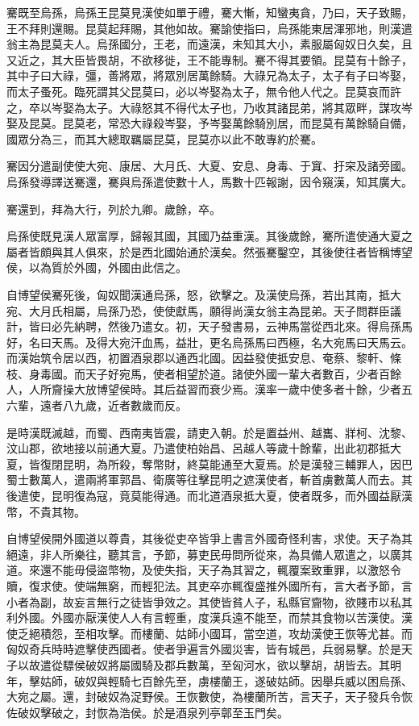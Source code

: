 騫既至烏孫，烏孫王昆莫見漢使如單于禮，騫大慚，知蠻夷貪，乃曰，天子致賜，王不拜則還賜。昆莫起拜賜，其他如故。騫諭使指曰，烏孫能東居渾邪地，則漢遣翁主為昆莫夫人。烏孫國分，王老，而遠漢，未知其大小，素服屬匈奴日久矣，且又近之，其大臣皆畏胡，不欲移徙，王不能專制。騫不得其要領。昆莫有十餘子，其中子曰大祿，彊，善將眾，將眾別居萬餘騎。大祿兄為太子，太子有子曰岑娶，而太子蚤死。臨死謂其父昆莫曰，必以岑娶為太子，無令他人代之。昆莫哀而許之，卒以岑娶為太子。大祿怒其不得代太子也，乃收其諸昆弟，將其眾畔，謀攻岑娶及昆莫。昆莫老，常恐大祿殺岑娶，予岑娶萬餘騎別居，而昆莫有萬餘騎自備，國眾分為三，而其大總取羈屬昆莫，昆莫亦以此不敢專約於騫。

騫因分遣副使使大宛、康居、大月氏、大夏、安息、身毒、于窴、扜穼及諸旁國。烏孫發導譯送騫還，騫與烏孫遣使數十人，馬數十匹報謝，因令窺漢，知其廣大。

騫還到，拜為大行，列於九卿。歲餘，卒。

烏孫使既見漢人眾富厚，歸報其國，其國乃益重漢。其後歲餘，騫所遣使通大夏之屬者皆頗與其人俱來，於是西北國始通於漢矣。然張騫鑿空，其後使往者皆稱博望侯，以為質於外國，外國由此信之。

自博望侯騫死後，匈奴聞漢通烏孫，怒，欲擊之。及漢使烏孫，若出其南，抵大宛、大月氏相屬，烏孫乃恐，使使獻馬，願得尚漢女翁主為昆弟。天子問群臣議計，皆曰必先納聘，然後乃遣女。初，天子發書易，云神馬當從西北來。得烏孫馬好，名曰天馬。及得大宛汗血馬，益壯，更名烏孫馬曰西極，名大宛馬曰天馬云。而漢始筑令居以西，初置酒泉郡以通西北國。因益發使抵安息、奄蔡、黎軒、條枝、身毒國。而天子好宛馬，使者相望於道。諸使外國一輩大者數百，少者百餘人，人所齎操大放博望侯時。其后益習而衰少焉。漢率一歲中使多者十餘，少者五六輩，遠者八九歲，近者數歲而反。

是時漢既滅越，而蜀、西南夷皆震，請吏入朝。於是置益州、越巂、牂柯、沈黎、汶山郡，欲地接以前通大夏。乃遣使柏始昌、呂越人等歲十餘輩，出此初郡抵大夏，皆復閉昆明，為所殺，奪幣財，終莫能通至大夏焉。於是漢發三輔罪人，因巴蜀士數萬人，遣兩將軍郭昌、衛廣等往擊昆明之遮漢使者，斬首虜數萬人而去。其後遣使，昆明復為寇，竟莫能得通。而北道酒泉抵大夏，使者既多，而外國益厭漢幣，不貴其物。

自博望侯開外國道以尊貴，其後從吏卒皆爭上書言外國奇怪利害，求使。天子為其絕遠，非人所樂往，聽其言，予節，募吏民毋問所從來，為具備人眾遣之，以廣其道。來還不能毋侵盜幣物，及使失指，天子為其習之，輒覆案致重罪，以激怒令贖，復求使。使端無窮，而輕犯法。其吏卒亦輒復盛推外國所有，言大者予節，言小者為副，故妄言無行之徒皆爭效之。其使皆貧人子，私縣官齎物，欲賤市以私其利外國。外國亦厭漢使人人有言輕重，度漢兵遠不能至，而禁其食物以苦漢使。漢使乏絕積怨，至相攻擊。而樓蘭、姑師小國耳，當空道，攻劫漢使王恢等尤甚。而匈奴奇兵時時遮擊使西國者。使者爭遍言外國災害，皆有城邑，兵弱易擊。於是天子以故遣從驃侯破奴將屬國騎及郡兵數萬，至匈河水，欲以擊胡，胡皆去。其明年，擊姑師，破奴與輕騎七百餘先至，虜樓蘭王，遂破姑師。因舉兵威以困烏孫、大宛之屬。還，封破奴為浞野侯。王恢數使，為樓蘭所苦，言天子，天子發兵令恢佐破奴擊破之，封恢為浩侯。於是酒泉列亭鄣至玉門矣。

